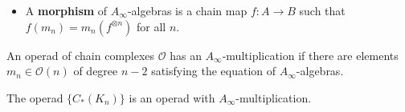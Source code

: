 \documentclass[final]{beamer}
\newlength{\onecolwid}
\begin{document}
\begin{frame}[t]
\begin{columns}[t]
       
         
         
         
         \begin{column}{\onecolwid} %
         \begin{block}{\vspace*{1.95cm}}
         \begin{itemize}
             \item A \textbf{morphism}  of $A_\infty$-algebras is a chain map $f:A\to B$ such that $f(m_n)=m_n(f^{\otimes n})$ for all $n$.
         \end{itemize}
           An operad of chain complexes $\mathcal{O}$ has an $A_\infty$-multiplication if there are elements $m_n\in\mathcal{O}(n)$ of degree $n-2$ satisfying the equation of $A_\infty$-algebras. 
\begin{alertblock}{}
  The operad $\{C_*(K_n)\}$ is an operad with  $A_\infty$-multiplication.
  \vspace{0.5cm}
\end{alertblock}


         \end{block}
         
         
        

\end{column}
\end{columns}
\end{frame}
\end{document}
